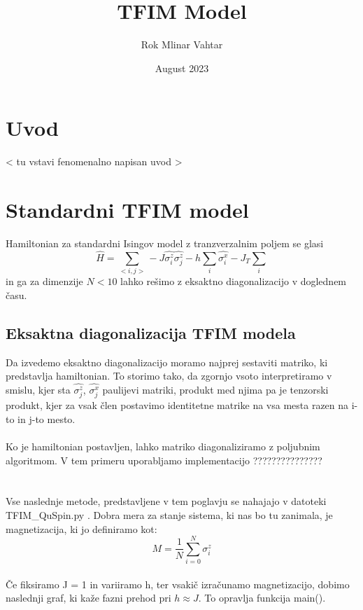 \documentclass{article}
\title{\HUGE TFIM Model}
\author{Rok Mlinar Vahtar}
\date{August 2023}
\begin{document}
\maketitle

\section{Uvod}
\textless \hspace{1pt} tu vstavi fenomenalno napisan uvod \textgreater


\section{Standardni TFIM model}
Hamiltonian za standardni Isingov model z tranzverzalnim poljem se glasi
\begin{equation}
    \hat{H} = \sum_{< i,j >} -J \hat{\sigma_i^z} \hat{\sigma_j^z} - h\sum_i \hat{\sigma_i^x} - J_T \sum_i
\end{equation}
in ga za dimenzije $N < 10$ lahko rešimo z eksaktno diagonalizacijo v doglednem času. 

 \subsection{Eksaktna diagonalizacija TFIM modela}
Da izvedemo eksaktno diagonalizacijo moramo najprej sestaviti matriko, ki predstavlja hamiltonian. To storimo tako, da zgornjo vsoto interpretiramo v smislu, kjer sta $\hat{\sigma_j^z}$, $\hat{\sigma_j^x}$ paulijevi matriki, produkt med njima pa je tenzorski produkt, kjer za vsak člen postavimo identitetne matrike na vsa mesta razen na i-to in j-to mesto.\\\\

\noindent Ko je hamiltonian postavljen, lahko matriko diagonaliziramo z poljubnim algoritmom. V tem primeru uporabljamo implementacijo ???????????????\\\\\\

 

\noindent Vse naslednje metode, predstavljene v tem poglavju se nahajajo v datoteki TFIM\_QuSpin.py . Dobra mera za stanje sistema, ki nas bo tu zanimala, je magnetizacija, ki jo definiramo kot:
\begin{equation}
    M = \frac{1}{N}\sum_{i=0}^N \sigma_i^z
\end{equation}\\
Če fiksiramo J = 1 in variiramo h, ter vsakič izračunamo magnetizacijo, dobimo naslednji graf, ki kaže fazni prehod pri $h \approx J$. To opravlja funkcija main().
\end{document}
